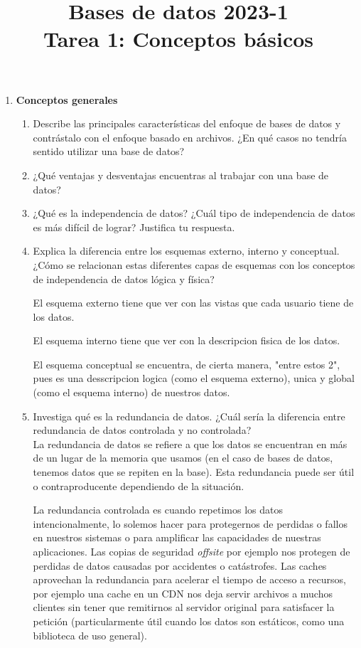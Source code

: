 \documentclass[11pt,letterpaper]{article}
\title{Bases de datos 2023-1\\
Tarea 1: Conceptos básicos}
\begin{document}
\maketitle

\begin{enumerate}
	\item \textbf{Conceptos generales}
		\begin{enumerate}
			\item Describe las principales características del enfoque de bases de datos y contrástalo con el enfoque
				basado en archivos. ¿En qué casos no tendría sentido utilizar una base de datos?

			\item ¿Qué ventajas y desventajas encuentras al trabajar con una base de datos?

			\item ¿Qué es la independencia de datos? ¿Cuál tipo de independencia de datos es más difícil de lograr?
				Justifica tu respuesta.

			\item Explica la diferencia entre los esquemas externo, interno y conceptual. ¿Cómo se relacionan estas
				diferentes capas de esquemas con los conceptos de independencia de datos lógica y física?

				El esquema externo tiene que ver con las vistas que cada usuario tiene de los datos.
				
				El esquema interno tiene que ver con la descripcion fisica de los datos.
				
				El esquema conceptual se encuentra, de cierta manera, "entre estos 2", pues es una desscripcion logica 
				(como el esquema externo), unica y global (como el esquema interno) de nuestros datos.

			\item Investiga qué es la redundancia de datos. ¿Cuál sería la diferencia entre redundancia de datos
				controlada y no controlada?\\

				La redundancia de datos se refiere a que los datos se encuentran en más de un lugar de
				la memoria que usamos (en el caso de bases de datos, tenemos datos que se repiten en la base).
				Esta redundancia puede ser útil o contraproducente dependiendo de la situación.

				La redundancia controlada es cuando repetimos los datos intencionalmente, lo solemos
				hacer para protegernos de perdidas o fallos en nuestros sistemas o para amplificar las
				capacidades de nuestras aplicaciones.
				Las copias de seguridad \textit{offsite} por ejemplo nos protegen de perdidas de datos
				causadas por accidentes o catástrofes.
				Las caches aprovechan la redundancia para acelerar el tiempo de acceso a recursos,
				por ejemplo una cache en un CDN nos deja servir archivos a muchos clientes sin
				tener que remitirnos al servidor original para satisfacer la petición
				(particularmente útil cuando los datos son estáticos, como una biblioteca de uso general).


\end{enumerate}
\end{enumerate}
\end{document}
